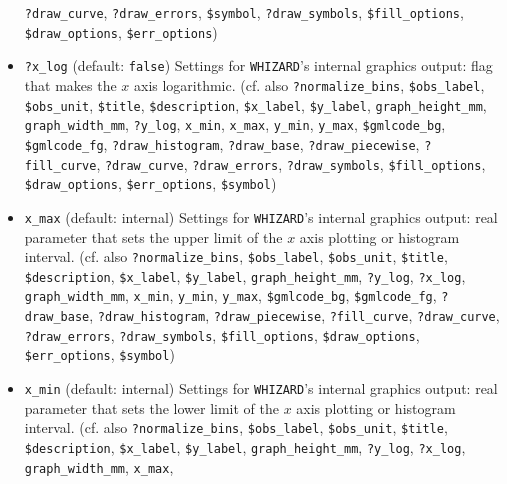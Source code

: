 \documentclass[12pt]{book}
\newcommand{\ttt}[1]{\texttt{#1}}
\newcommand{\whizard}{\texttt{WHIZARD}}
\begin{document}
\begin{itemize}
\ttt{?draw\_curve}, \ttt{?draw\_errors}, \ttt{\$symbol}, 
\ttt{?draw\_symbols}, \ttt{\$fill\_options}, \ttt{\$draw\_options},
\ttt{\$err\_options})
\item
\ttt{?x\_log} \qquad (default: \ttt{false}) \newline
Settings for \whizard's internal graphics output: flag that
makes the $x$ axis logarithmic. (cf. also
\ttt{?normalize\_bins}, \ttt{\$obs\_label}, \ttt{\$obs\_unit},
\ttt{\$title}, \ttt{\$description}, \ttt{\$x\_label},
\ttt{\$y\_label}, \ttt{graph\_height\_mm}, \ttt{graph\_width\_mm}, 
\ttt{?y\_log}, \ttt{x\_min}, \ttt{x\_max},
\ttt{y\_min}, \ttt{y\_max}, \newline \ttt{\$gmlcode\_bg}, \ttt{\$gmlcode\_fg},
\ttt{?draw\_histogram}, \ttt{?draw\_base}, \ttt{?draw\_piecewise},
\newline \ttt{?fill\_curve}, \ttt{?draw\_curve}, \ttt{?draw\_errors},
\ttt{?draw\_symbols}, \ttt{\$fill\_options}, \newline \ttt{\$draw\_options},
\ttt{\$err\_options}, \ttt{\$symbol})
\item
\ttt{x\_max} \qquad (default: internal) \newline
Settings for \whizard's internal graphics output: real parameter that
sets the upper limit of the $x$ axis plotting or histogram interval. (cf. also
\ttt{?normalize\_bins}, \ttt{\$obs\_label}, \ttt{\$obs\_unit},
\ttt{\$title}, \ttt{\$description}, \ttt{\$x\_label},
\ttt{\$y\_label}, \ttt{graph\_height\_mm}, \ttt{?y\_log},
\newline \ttt{?x\_log}, \ttt{graph\_width\_mm}, \ttt{x\_min},
\ttt{y\_min}, \ttt{y\_max}, \ttt{\$gmlcode\_bg}, \ttt{\$gmlcode\_fg},
\ttt{?draw\_base}, \newline \ttt{?draw\_histogram}, \ttt{?draw\_piecewise},
\ttt{?fill\_curve}, \ttt{?draw\_curve}, \ttt{?draw\_errors},
\newline \ttt{?draw\_symbols}, \ttt{\$fill\_options}, \ttt{\$draw\_options},
\ttt{\$err\_options}, \ttt{\$symbol})
\item
\ttt{x\_min} \qquad (default: internal) \newline
Settings for \whizard's internal graphics output: real parameter that
sets the lower limit of the $x$ axis plotting or histogram interval. (cf. also
\ttt{?normalize\_bins}, \ttt{\$obs\_label}, \ttt{\$obs\_unit},
\ttt{\$title}, \ttt{\$description}, \ttt{\$x\_label},
\ttt{\$y\_label}, \ttt{graph\_height\_mm}, \ttt{?y\_log},
\newline \ttt{?x\_log}, \ttt{graph\_width\_mm}, \ttt{x\_max},

\end{itemize}
\end{document}
